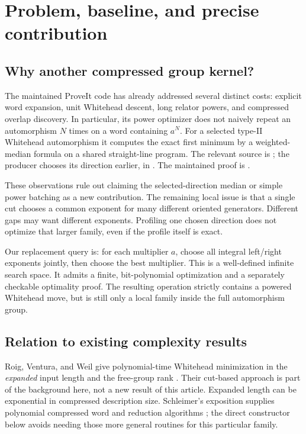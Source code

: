 \documentclass[11pt,letterpaper]{article}
\theoremstyle{definition}
\theoremstyle{remark}\newtheorem{remark}[theorem]{Remark}
\begin{document}
\section{Problem, baseline, and precise contribution}
\label{sec:context}

\subsection{Why another compressed group kernel?}

The maintained ProveIt code has already addressed several distinct costs:
explicit word expansion, unit Whitehead descent, long relator powers, and
compressed overlap discovery. In particular, its power optimizer does not
naively repeat an automorphism $N$ times on a word containing $a^N$.
For a selected type-II Whitehead automorphism it computes the exact first
minimum by a weighted-median formula on a shared straight-line program.
The relevant source is ; the
producer chooses its direction earlier, in .
The maintained proof is 
\cite{proveit,powerrepo}.

These observations rule out claiming the selected-direction median or simple
power batching as a new contribution. The remaining local issue is that a
single cut chooses a common exponent for many different oriented generators.
Different gaps may want different exponents. Profiling one chosen direction
does not optimize that larger family, even if the profile itself is exact.

Our replacement query is: for each multiplier $a$, choose all integral
left/right exponents jointly, then choose the best multiplier. This is a
well-defined infinite search space. It admits a finite, bit-polynomial
optimization and a separately checkable optimality proof. The resulting
operation strictly contains a powered Whitehead move, but is still only a
local family inside the full automorphism group.

\subsection{Relation to existing complexity results}

Roig, Ventura, and Weil give polynomial-time Whitehead minimization in the
\emph{expanded} input length and the free-group rank \cite{rvw}. Their
cut-based approach is part of the background here, not a new result of this
article. Expanded length can be exponential in compressed description size.
Schleimer's exposition supplies polynomial compressed word and reduction
algorithms \cite{schleimer}; the direct constructor below avoids needing
those more general routines for this particular family.
\end{document}
